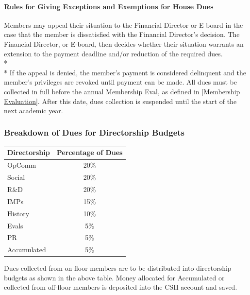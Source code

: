 \documentclass{article}
\newcommand{\asubsection}[1]{\subsubsection{#1} \label{#1}}
\newcommand{\asubsubsection}[1]{\paragraph{#1} \label{#1}}
\begin{document}
\asubsubsection{Rules for Giving Exceptions and Exemptions for House Dues}
Members may appeal their situation to the Financial Director or E-board in the case that the member is dissatisfied with the Financial Director's decision.
The Financial Director, or E-board, then decides whether their situation warrants an extension to the payment deadline and/or reduction of the required dues.
\\*\\*
If the appeal is denied, the member’s payment is considered delinquent and the member’s privileges are revoked until payment can be made.
All dues must be collected in full before the annual Membership Eval, as defined in \ref{Membership Evaluation}.
After this date, dues collection is suspended until the start of the next academic year.
\asubsection{Breakdown of Dues for Directorship Budgets}
\begin{center}
	\begin{tabular}[c]{|l c|}
		\hline
		Directorship & Percentage of Dues
		\\ \hline
		\hline
		OpComm       & 20\%
		\\ \hline
		Social       & 20\%
		\\ \hline
		R\&D         & 20\%
		\\ \hline
		IMPs         & 15\%
		\\ \hline
		History      & 10\%
		\\ \hline
		Evals        & 5\%
		\\ \hline
		PR           & 5\%
		\\ \hline
		Accumulated  & 5\%
		\\ \hline
	\end{tabular}
\end{center}
Dues collected from on-floor members are to be distributed into directorship budgets as shown in the above table.
Money allocated for Accumulated or collected from off-floor members is deposited into the CSH account and saved.
\end{document}
